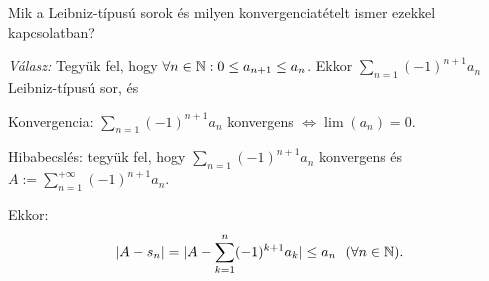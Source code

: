 \documentclass[a4paper,12pt]{article}
\begin{document}
\begin{compactenum}
		\bigskip 
		\item Mik a Leibniz-típusú sorok és milyen konvergenciatételt ismer ezekkel kapcsolatban?
		
		\emph{Válasz:} Tegyük fel, hogy $ \forall n \in \mathbb{N} : 0 \leq a_{n+1}\leq a_{n}$. Ekkor $\sum_{n=1} (-1)^{n+1} a_n$ Leibniz-típusú sor, és
		
		\begin{compactenum}
			\item Konvergencia: $\sum_{n=1} (-1)^{n+1} a_n$ konvergens $\Leftrightarrow \lim(a_n)=0$.
			
			\smallskip
			\item Hibabecslés: tegyük fel, hogy $\sum_{n=1} (-1)^{n+1} a_n$ konvergens és \\ $A:=\displaystyle \sum_{n=1}^{+\infty} (-1)^{n+1} a_n$.
			
			Ekkor:
			\[|A-s_n|=|A-\displaystyle \sum_{k=1}^{n} (-1)^{k+1} a_k| \leq a_n~~ (\forall n \in \mathbb{N}).\]
		\end{compactenum}
	\end{compactenum}
	
	
\end{document}
